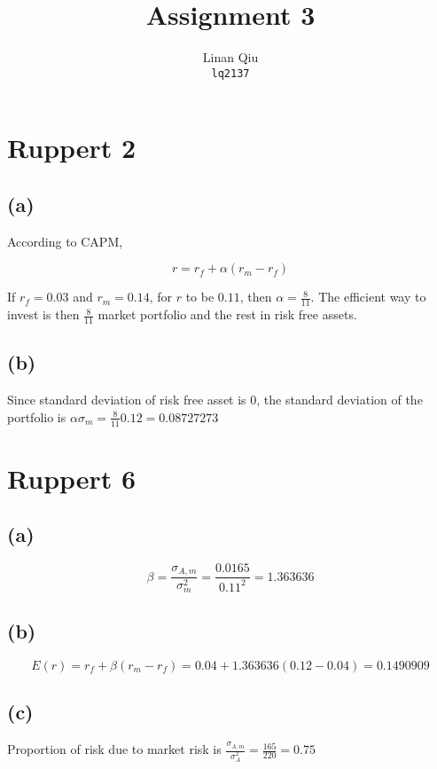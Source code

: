 \documentclass[11pt]{scrartcl}
\title{Assignment 3}
\author{Linan Qiu\\\texttt{lq2137}}
\begin{document}
\maketitle

\section*{Ruppert 2}

\subsection*{(a)}

According to CAPM,

\[r = r_f + \alpha(r_m - r_f)\]

If $r_f = 0.03$ and $r_m = 0.14$, for $r$ to be $0.11$, then $\alpha = \frac{8}{11}$. The efficient way to invest is then $\frac{8}{11}$ market portfolio and the rest in risk free assets.

\subsection*{(b)}

Since standard deviation of risk free asset is 0, the standard deviation of the portfolio is $\alpha \sigma_m = \frac{8}{11}0.12 = 0.08727273$

\section*{Ruppert 6}

\subsection*{(a)}

\[\beta = \frac{\sigma_{A,m}}{\sigma^2_m} = \frac{0.0165}{0.11^2} = 1.363636\]

\subsection*{(b)}

\[E(r) = r_f + \beta(r_m - r_f) = 0.04 + 1.363636(0.12-0.04) = 0.1490909\]

\subsection*{(c)}

Proportion of risk due to market risk is $\frac{\sigma_{A,m}}{\sigma_A^2} = \frac{165}{220} = 0.75$
\end{document}
